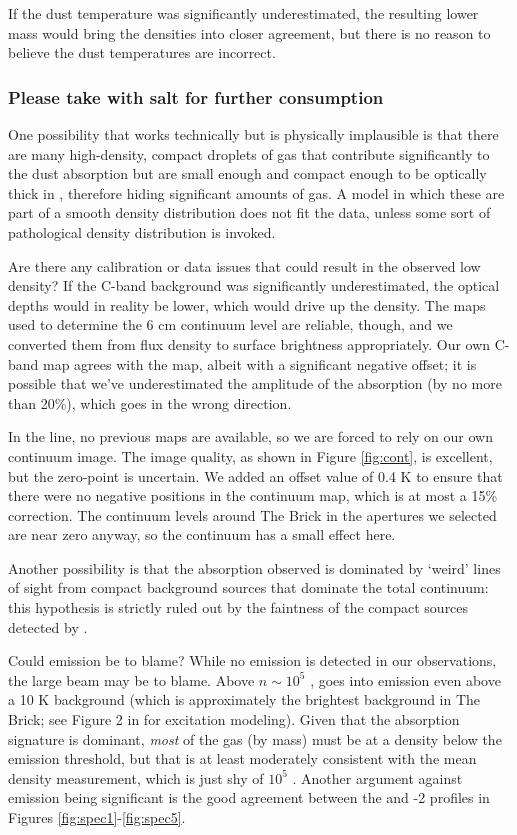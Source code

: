 If the dust temperature was significantly underestimated, the resulting lower mass 
would bring the densities into closer agreement, but there is no reason to believe
the dust temperatures are incorrect.

\subsubsection{Please take with salt for further consumption}
One possibility that works technically but is physically implausible is that
there are many high-density, compact droplets of gas that contribute
significantly to the dust absorption but are small enough and compact enough to
be optically thick in \formaldehyde \oneone, therefore hiding significant
amounts of gas.  A model in which these are part of a smooth density
distribution does not fit the data, unless some sort of pathological density
distribution is invoked.

Are there any calibration or data issues that could result in the observed low
density?  If the C-band background was significantly underestimated, the \oneone
optical depths would in reality be lower, which would drive up the density.
The \citet{Law2008a} maps used to determine the 6 cm \oneone continuum level
are reliable, though, and we converted them from flux density to surface brightness
appropriately.  Our own C-band map agrees with the \citet{Law2008a} map, albeit
with a significant negative offset; it is possible that we've underestimated
the amplitude of the \formaldehyde absorption (by no more than 20\%), which
goes in the wrong direction.

In the \twotwo line, no previous maps are available, so we are forced to rely
on our own continuum image.  The image quality, as shown in Figure
\ref{fig:cont}, is excellent, but the zero-point is uncertain.  We added an
offset value of 0.4 K to ensure that there were no negative positions in the
continuum map, which is at most a 15\% correction.  The continuum levels around
The Brick in the apertures we selected are near zero anyway, so the continuum
has a small effect here.

Another possibility is that the absorption observed is dominated by `weird'
lines of sight from compact background sources that dominate the total
continuum: this hypothesis is strictly ruled out by the faintness of the
compact sources detected by \citet{Rodriguez2013a}.

Could \formaldehyde emission be to blame?  While no \formaldehyde emission is
detected in our observations, the large beam may be to blame.  Above
$n\sim10^5$ \percc, \formaldehyde goes into emission even above a 10 K
background (which is approximately the brightest background in The Brick; see
Figure 2 in \citet{Darling2012b} for excitation modeling).  Given that the
absorption signature is dominant, \emph{most} of the gas (by mass) must be at a
density below the emission threshold, but that is at least moderately
consistent with the \citet{Longmore2012b} mean density measurement, which is
just shy of $10^5$ \percc.  Another argument against \formaldehyde emission
being significant is the good agreement between the \formaldehyde and -2 profiles in Figures \ref{fig:spec1}-\ref{fig:spec5}.


